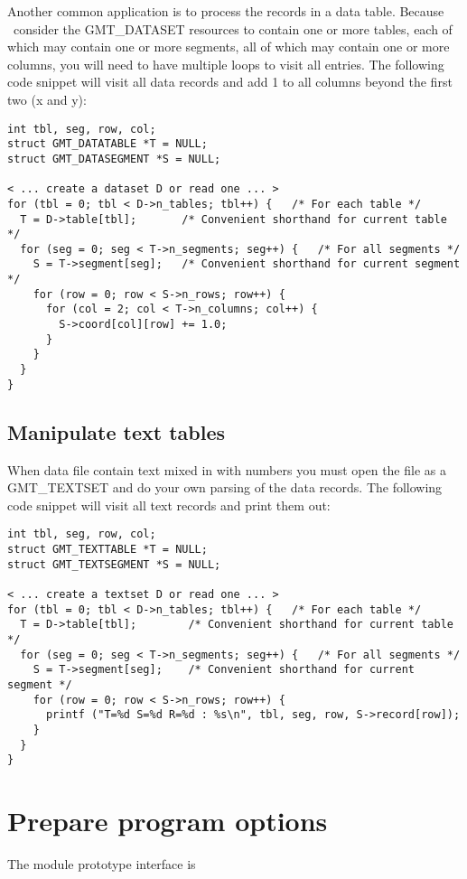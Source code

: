 \documentclass[11pt]{report}
\begin{document}
Another common application is to process the records in a data table.
Because \GMT\ consider the GMT\_DATASET resources to contain one or
more tables, each of which may contain one or more segments, all of
which may contain one or more columns, you will need to have multiple
loops to visit all entries.  The following code snippet will visit
all data records and add 1 to all columns beyond the first two (x and y):

\begin{verbatim}
int tbl, seg, row, col;
struct GMT_DATATABLE *T = NULL;
struct GMT_DATASEGMENT *S = NULL;

< ... create a dataset D or read one ... >
for (tbl = 0; tbl < D->n_tables; tbl++) {	/* For each table */
  T = D->table[tbl];       /* Convenient shorthand for current table */
  for (seg = 0; seg < T->n_segments; seg++) {	/* For all segments */
    S = T->segment[seg];   /* Convenient shorthand for current segment */
    for (row = 0; row < S->n_rows; row++) {
      for (col = 2; col < T->n_columns; col++) {
        S->coord[col][row] += 1.0;
      }
    }
  }
}
\end{verbatim}

\subsection{Manipulate text tables}

When data file contain text mixed in with numbers you must open the
file as a GMT\_TEXTSET and do your own parsing of the data records.
The following code snippet will visit all text records and print
them out:

\begin{verbatim}
int tbl, seg, row, col;
struct GMT_TEXTTABLE *T = NULL;
struct GMT_TEXTSEGMENT *S = NULL;

< ... create a textset D or read one ... >
for (tbl = 0; tbl < D->n_tables; tbl++) {	/* For each table */
  T = D->table[tbl];        /* Convenient shorthand for current table */
  for (seg = 0; seg < T->n_segments; seg++) {	/* For all segments */
    S = T->segment[seg];    /* Convenient shorthand for current segment */
    for (row = 0; row < S->n_rows; row++) {
      printf ("T=%d S=%d R=%d : %s\n", tbl, seg, row, S->record[row]);
    }
  }
}
\end{verbatim}

\section{Prepare program options}
\label{sec:func}
The module prototype interface is
\end{document}
